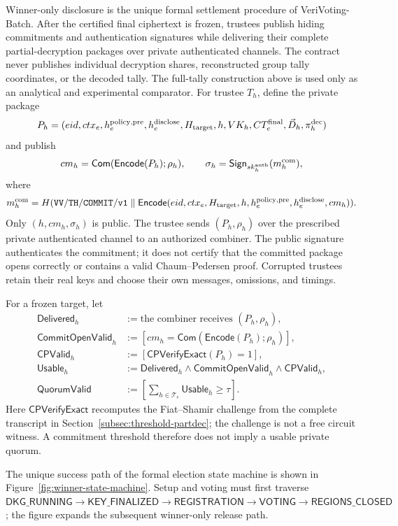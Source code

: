 \documentclass[pdflatex,sn-mathphys-num]{sn-jnl}%
\theoremstyle{thmstyleone}%
\theoremstyle{thmstyletwo}%
\theoremstyle{thmstylethree}%
\begin{document}
Winner-only disclosure is the unique formal settlement procedure of
VeriVoting-Batch.  After the certified final ciphertext is frozen, trustees
publish hiding commitments and authentication signatures while delivering
their complete partial-decryption packages over private authenticated
channels.  The contract never publishes individual decryption shares,
reconstructed group tally coordinates, or the decoded tally.  The full-tally
construction above is used only as an analytical and experimental comparator.
For
trustee $T_h$, define the private package
\[
 P_h=(eid,ctx_e,h_e^{\rm policy,pre},h_e^{\rm disclose},
       H_{\rm target},h,VK_h,CT_e^{\rm final},
       \vec D_h,\pi_h^{\rm dec})
\]
and publish
\[
 cm_h=\mathsf{Com}(\mathsf{Encode}(P_h);\rho_h),\qquad
 \sigma_h=\mathsf{Sign}_{sk_h^{\rm auth}}(m_h^{\rm com}),
\]
where
\[
 m_h^{\rm com}=H(\mathtt{VV/TH/COMMIT/v1}\parallel
 \mathsf{Encode}(eid,ctx_e,H_{\rm target},h,
                 h_e^{\rm policy,pre},h_e^{\rm disclose},cm_h)).
\]
Only $(h,cm_h,\sigma_h)$ is public.  The trustee sends
$(P_h,\rho_h)$ over the prescribed private authenticated channel to an
authorized combiner.  The public signature authenticates the commitment; it
does not certify that the committed package opens correctly or contains a
valid Chaum--Pedersen proof.  Corrupted trustees retain their real keys and
choose their own messages, omissions, and timings.

For a frozen target, let
\[
\begin{aligned}
 \mathsf{Delivered}_h&:=\text{the combiner receives }(P_h,\rho_h),\\
 \mathsf{CommitOpenValid}_h&:=
   [cm_h=\mathsf{Com}(\mathsf{Encode}(P_h);\rho_h)],\\
 \mathsf{CPValid}_h&:=
   [\mathsf{CPVerifyExact}(P_h)=1],\\
 \mathsf{Usable}_h&:=\mathsf{Delivered}_h\land
   \mathsf{CommitOpenValid}_h\land\mathsf{CPValid}_h,\\
 \mathsf{QuorumValid}&:=\left[\sum_{h\in\mathcal T_e}
                         \mathsf{Usable}_h\geq\tau\right].
\end{aligned}
\]
Here $\mathsf{CPVerifyExact}$ recomputes the Fiat--Shamir challenge from the
complete transcript in Section~\ref{subsec:threshold-partdec}; the challenge
is not a free circuit witness.  A commitment threshold therefore does not
imply a usable private quorum.

The unique success path of the formal election state machine is shown in
Figure~\ref{fig:winner-state-machine}.  Setup and voting must first traverse
$\mathsf{DKG\_RUNNING}\rightarrow\mathsf{KEY\_FINALIZED}
\rightarrow\mathsf{REGISTRATION}\rightarrow\mathsf{VOTING}
\rightarrow\mathsf{REGIONS\_CLOSED}$; the figure expands the subsequent
winner-only release path.
\end{document}

